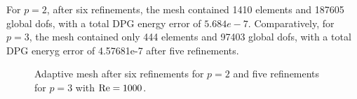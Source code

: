 For $p=2$, after six refinements, the mesh contained 1410 elements and 187605 global dofs, with a total DPG energy error of $5.684e-7$. Comparatively, for $p=3$, the mesh contained only 444 elements and 97403 global dofs, with a total DPG eneryg error of 4.57681e-7 after five refinements. 

\begin{figure}[!h]
\centering
{}
\caption{Adaptive mesh after six refinements for $p=2$ and five refinements for $p=3$ with $\Reyn = 1000$.}
\label{fig:MeshRe500}
\end{figure}
